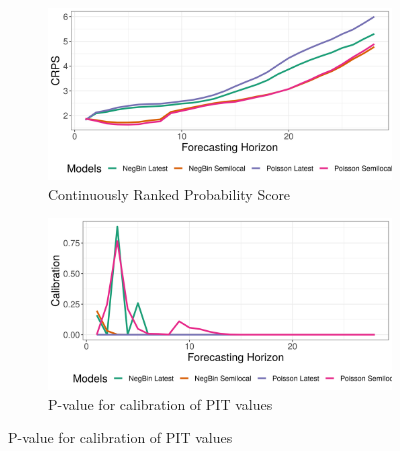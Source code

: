 \documentclass[12pt]{article}
\begin{document}
\begin{figure}[h!]
\begin{subfigure}{0.5\textwidth}
  \centering
  \includegraphics[width=\linewidth]{../output/national_crps.png}  
  \caption{Continuously Ranked Probability Score}
  \label{fig:sub-first}
\end{subfigure}
\begin{subfigure}{0.5\textwidth}
  \centering
  \includegraphics[width=\linewidth]{../output/national_calibration.png}  
  \caption{P-value for calibration of PIT values}
  \label{fig:sub-second}
\end{subfigure}


\end{figure}
\end{document}
